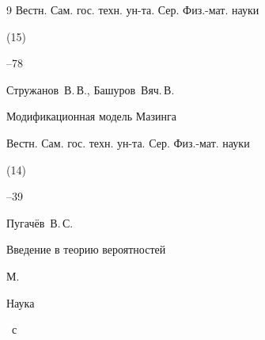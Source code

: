 \begin{thebibliography}{9}
\jour Вестн. Сам. гос. техн. ун-та. Сер. Физ.-мат. науки


(15)

--78




\by Стружанов~В.\,В., Башуров~Вяч.\,В.

\paper Модификационная модель Мазинга

\jour Вестн. Сам. гос. техн. ун-та. Сер. Физ.-мат. науки


(14)

--39




\by Пугачёв~В.\,С.

\book Введение в теорию вероятностей

\publaddr М.

\publ Наука


~с

\end{thebibliography}



\vspace{-0.8cm}

\makeengtitlem

%


%


%

% 


